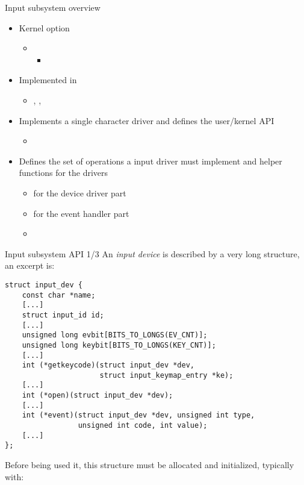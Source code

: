 \begin{frame}{Input subsystem overview}
  \begin{itemize}
  \item Kernel option 
    \begin{itemize}
    \item {}
      \begin{itemize}
      \item {}
      \end{itemize}
    \end{itemize}
  \item Implemented in 
    \begin{itemize}
    \item {}, , 
    \end{itemize}
  \item Implements a single character driver and defines the
    user/kernel API
    \begin{itemize}
    \item {}
    \end{itemize}
  \item Defines the set of operations a input driver must implement
    and helper functions for the drivers
    \begin{itemize}
    \item {} for the device driver part
    \item {} for the event handler part
    \item  {}
    \end{itemize}
  \end{itemize}
\end{frame}

\begin{frame}[fragile]{Input subsystem API 1/3}
  An {\em input device} is described by a very long
   structure, an excerpt is:
  \begin{block}{}
  \begin{verbatim}
struct input_dev {
    const char *name;
    [...]
    struct input_id id;
    [...]
    unsigned long evbit[BITS_TO_LONGS(EV_CNT)];
    unsigned long keybit[BITS_TO_LONGS(KEY_CNT)];
    [...]
    int (*getkeycode)(struct input_dev *dev,
                      struct input_keymap_entry *ke);
    [...]
    int (*open)(struct input_dev *dev);
    [...]
    int (*event)(struct input_dev *dev, unsigned int type,
                 unsigned int code, int value);
    [...]
};
\end{verbatim}
\end{block}
  Before being used it, this structure must be allocated and
  initialized, typically with:
\end{frame}

